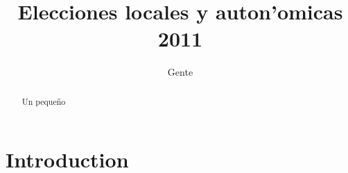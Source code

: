 \documentclass[11pt,twoside]{article}
\begin{document}
\title{Elecciones locales y auton'omicas 2011}
\author{Gente}
\maketitle

\begin{abstract}
Un peque\~no
\end{abstract}

\tableofcontents

\section{Introduction}
\end{document}

